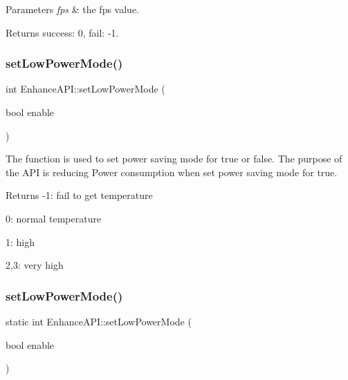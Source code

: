 \begin{DoxyParams}{Parameters}
{\em fps} & the fps value. \\
\hline
\end{DoxyParams}
\begin{DoxyReturn}{Returns}
success\+: 0, fail\+: -\/1. 
\end{DoxyReturn}
\mbox{\label{classEnhanceAPI_ad42c34b31bc6dc5f6e8b343817b50952}} 
\subsubsection{\texorpdfstring{set\+Low\+Power\+Mode()}{setLowPowerMode()}\hspace{0.1cm}{\footnotesize\ttfamily [1/2]}}
{\footnotesize\ttfamily int Enhance\+A\+P\+I\+::set\+Low\+Power\+Mode (\begin{DoxyParamCaption}\item[{bool}]{enable }\end{DoxyParamCaption})\hspace{0.3cm}{\ttfamily [static]}}



The function is used to set power saving mode for true or false. The purpose of the A\+PI is reducing Power consumption when set power saving mode for true. 

\begin{DoxyReturn}{Returns}
-\/1\+: fail to get temperature
\begin{DoxyItemize}
\item 0\+: normal temperature
\item 1\+: high
\item 2,3\+: very high 
\end{DoxyItemize}
\end{DoxyReturn}
\mbox{\label{classEnhanceAPI_a96c78fe2277b1c0d4fe03cce4adf1a16}} 
\subsubsection{\texorpdfstring{set\+Low\+Power\+Mode()}{setLowPowerMode()}\hspace{0.1cm}{\footnotesize\ttfamily [2/2]}}
{\footnotesize\ttfamily static int Enhance\+A\+P\+I\+::set\+Low\+Power\+Mode (\begin{DoxyParamCaption}\item[{bool}]{enable }\end{DoxyParamCaption})\hspace{0.3cm}{\ttfamily [static]}}



